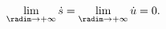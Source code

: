 \begin{equation}
\label{eq:sinf}
\lim_{\radim \to +\infty} \dot{s} =\lim_{\radim \to +\infty} \dot{u} =
0.
\end{equation}

